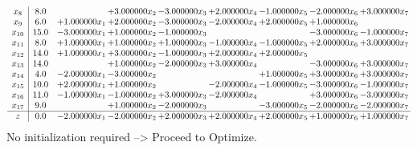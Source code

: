 \documentclass[10pt]{article}
\begin{document}
\[\begin{array}{c| c c@{\hskip 2pt} c@{\hskip 2pt} c@{\hskip 2pt} c@{\hskip 2pt} c@{\hskip 2pt} c@{\hskip 2pt} c@{\hskip 2pt} }
 x_{8}   &  8.0  &   & + 3.000000 x_{2} & -3.000000 x_{3} & + 2.000000 x_{4} & -1.000000 x_{5} & -2.000000 x_{6} & + 3.000000 x_{7}\\
 x_{9}   &  6.0 & + 1.000000 x_{1} & + 2.000000 x_{2} & -3.000000 x_{3} & -2.000000 x_{4} & + 2.000000 x_{5} & + 1.000000 x_{6} &   \\
 x_{10}   &  15.0 & -3.000000 x_{1} & + 1.000000 x_{2} & -1.000000 x_{3} &    &   & -3.000000 x_{6} & -1.000000 x_{7}\\
 x_{11}   &  8.0 & + 1.000000 x_{1} & + 1.000000 x_{2} & + 1.000000 x_{3} & -1.000000 x_{4} & -1.000000 x_{5} & + 2.000000 x_{6} & + 3.000000 x_{7}\\
 x_{12}   &  14.0 & + 1.000000 x_{1} & + 3.000000 x_{2} & -1.000000 x_{3} & + 2.000000 x_{4} & + 2.000000 x_{5} &    &   \\
 x_{13}   &  14.0  &   & + 1.000000 x_{2} & -2.000000 x_{3} & + 3.000000 x_{4} &   & -3.000000 x_{6} & + 3.000000 x_{7}\\
 x_{14}   &  4.0 & -2.000000 x_{1} & -3.000000 x_{2} &    &   & + 1.000000 x_{5} & + 3.000000 x_{6} & + 3.000000 x_{7}\\
 x_{15}   &  10.0 & + 2.000000 x_{1} & + 1.000000 x_{2} &   & -2.000000 x_{4} & -1.000000 x_{5} & -3.000000 x_{6} & -1.000000 x_{7}\\
 x_{16}   &  11.0 & -1.000000 x_{1} & -1.000000 x_{2} & + 3.000000 x_{3} & -2.000000 x_{4} &   & + 3.000000 x_{6} & -3.000000 x_{7}\\
 x_{17}   &  9.0  &   & + 1.000000 x_{2} & -2.000000 x_{3} &   & -3.000000 x_{5} & -2.000000 x_{6} & -2.000000 x_{7}\\
\hline
z    &  0.0 & -2.000000 x_{1} & -2.000000 x_{2} & + 2.000000 x_{3} & + 2.000000 x_{4} & + 2.000000 x_{5} & + 1.000000 x_{6} & + 1.000000 x_{7}\\
\end{array}\]
No initialization required --> Proceed to Optimize. 
\end{document}
